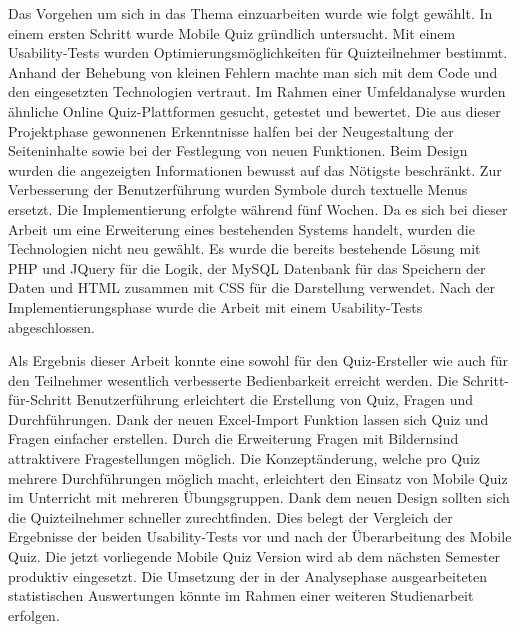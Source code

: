 Das Vorgehen um sich in das Thema einzuarbeiten wurde wie folgt gewählt. In einem ersten Schritt wurde Mobile Quiz gründlich untersucht. Mit einem \gls{Usability-Tests} wurden Optimierungsmöglichkeiten für Quizteilnehmer bestimmt. Anhand der Behebung von kleinen Fehlern machte man sich mit dem Code und den eingesetzten Technologien vertraut. Im Rahmen einer Umfeldanalyse wurden ähnliche Online Quiz-Plattformen gesucht, getestet und bewertet. Die aus dieser Projektphase gewonnenen Erkenntnisse halfen bei der Neugestaltung der Seiteninhalte sowie bei der Festlegung von neuen Funktionen. Beim Design wurden die angezeigten Informationen bewusst auf das Nötigste beschränkt. Zur Verbesserung der Benutzerführung wurden Symbole durch textuelle Menus ersetzt. Die Implementierung erfolgte während fünf Wochen. Da es sich bei dieser Arbeit um eine Erweiterung eines bestehenden Systems handelt, wurden die Technologien nicht neu gewählt. Es wurde die bereits bestehende Lösung mit PHP und JQuery für die Logik, der MySQL Datenbank für das Speichern der Daten und HTML zusammen mit CSS für die Darstellung verwendet. Nach der Implementierungsphase wurde die Arbeit mit einem \gls{Usability-Tests} abgeschlossen.

\bigskip

Als Ergebnis dieser Arbeit konnte eine sowohl für den Quiz-Ersteller wie auch für den Teilnehmer wesentlich verbesserte Bedienbarkeit erreicht werden. Die Schritt-für-Schritt Benutzerführung erleichtert die Erstellung von Quiz, Fragen und Durchführungen. Dank der neuen Excel-Import Funktion lassen sich Quiz und Fragen einfacher erstellen. Durch die Erweiterung \glqq Fragen mit Bildern\grqq sind attraktivere Fragestellungen möglich. Die Konzeptänderung, welche pro Quiz mehrere Durchführungen möglich macht, erleichtert den Einsatz von Mobile Quiz im Unterricht mit mehreren Übungsgruppen. Dank dem neuen Design sollten sich die Quizteilnehmer schneller zurechtfinden. Dies belegt der Vergleich der Ergebnisse der beiden Usability-Tests vor und nach der Überarbeitung des Mobile Quiz. Die jetzt vorliegende Mobile Quiz Version wird ab dem nächsten Semester produktiv eingesetzt. Die Umsetzung der in der Analysephase ausgearbeiteten statistischen Auswertungen könnte im Rahmen einer weiteren Studienarbeit erfolgen.